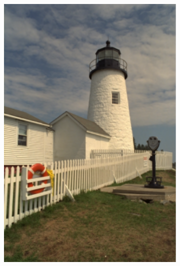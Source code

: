 \begin{figure}[t]
	\centering
    \captionsetup[subfigure]{aboveskip=-1pt,belowskip=2pt}
	\begin{subfigure}{.2\textwidth}
		\centering
		\includegraphics[width=.95\textwidth]{figures/kodim19_original.pdf}
        \caption*{\tiny \ \\ \ }
	\end{subfigure}%
	\begin{subfigure}{.2\textwidth}
		\centering

\end{subfigure}
\end{figure}
